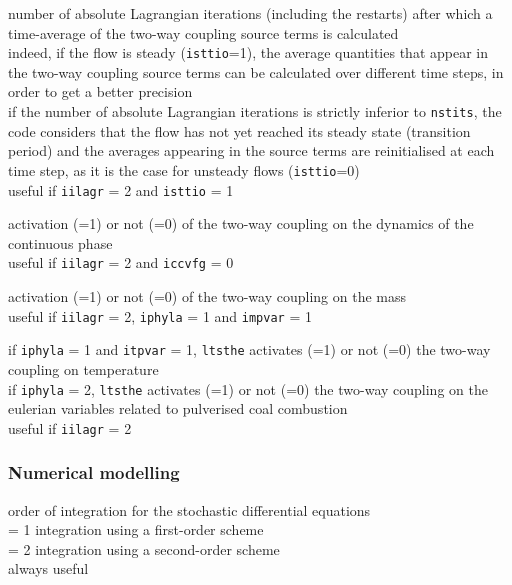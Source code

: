 {number of absolute Lagrangian iterations (including the restarts)
after which a time-average of the two-way coupling source terms is
calculated\\
indeed, if the flow is steady (\texttt{isttio}=1), the average quantities
that appear in the two-way coupling source terms can be calculated over
different time steps, in order to get a better precision\\
if the number of absolute Lagrangian iterations is strictly inferior to
\texttt{nstits}, the code considers that the flow has not yet reached its
steady state (transition period) and the averages appearing in the source
terms are reinitialised at each time step, as it is the case for unsteady
flows (\texttt{isttio}=0)\\
useful if \texttt{iilagr} = 2 and \texttt{isttio} = 1}

{activation (=1) or not (=0) of the two-way coupling on the dynamics of the
continuous phase\\
useful if \texttt{iilagr} = 2 and \texttt{iccvfg} = 0}

{activation (=1) or not (=0) of the two-way coupling on the mass\\
useful if \texttt{iilagr} = 2, \texttt{iphyla} = 1 and \texttt{impvar} = 1}

{if \texttt{iphyla} = 1 and \texttt{itpvar} = 1, \texttt{ltsthe}
 activates (=1) or not (=0) the two-way coupling on temperature\\
if \texttt{iphyla} = 2, \texttt{ltsthe} activates (=1) or not (=0) the
two-way coupling on the eulerian variables related to pulverised coal
combustion\\
useful if \texttt{iilagr} = 2}

\subsubsection{Numerical modelling}

{order of integration for the stochastic differential equations\\
\hspace*{1.3cm} = 1 integration using a first-order scheme\\
\hspace*{1.3cm} = 2 integration using a second-order scheme\\
always useful}

